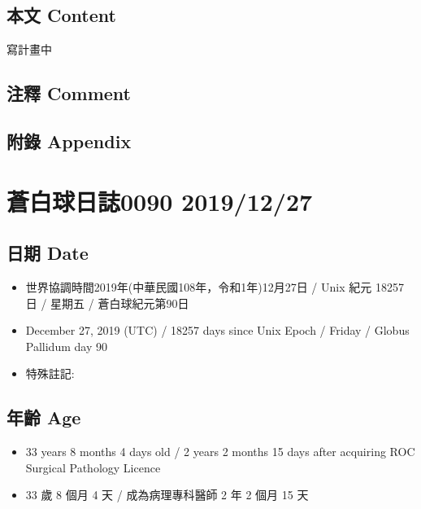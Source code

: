 \documentclass[a5paper, 12pt
]{book}
\providecommand{\tightlist}{%
  \setlength{\itemsep}{0pt}\setlength{\parskip}{0pt}}
\begin{document}
\hypertarget{ux672cux6587-content-25}{%
\subsection{本文 Content}\label{ux672cux6587-content-25}}

寫計畫中

\hypertarget{ux6ce8ux91cb-comment-24}{%
\subsection{注釋 Comment}\label{ux6ce8ux91cb-comment-24}}

\hypertarget{ux9644ux9304-appendix-25}{%
\subsection{附錄 Appendix}\label{ux9644ux9304-appendix-25}}

\hypertarget{ux84bcux767dux7403ux65e5ux8a8c0090-20191227}{%
\section{蒼白球日誌0090
2019/12/27}\label{ux84bcux767dux7403ux65e5ux8a8c0090-20191227}}

\hypertarget{ux65e5ux671f-date-26}{%
\subsection{日期 Date}\label{ux65e5ux671f-date-26}}

\begin{itemize}
\tightlist
\item
  世界協調時間2019年(中華民國108年，令和1年)12月27日 / Unix 紀元 18257
  日 / 星期五 / 蒼白球紀元第90日
\item
  December 27, 2019 (UTC) / 18257 days since Unix Epoch / Friday /
  Globus Pallidum day 90
\item
  特殊註記:
\end{itemize}

\hypertarget{ux5e74ux9f61-age-26}{%
\subsection{年齡 Age}\label{ux5e74ux9f61-age-26}}

\begin{itemize}
\tightlist
\item
  33 years 8 months 4 days old / 2 years 2 months 15 days after
  acquiring ROC Surgical Pathology Licence
\item
  33 歲 8 個月 4 天 / 成為病理專科醫師 2 年 2 個月 15 天
\end{itemize}
\end{document}
